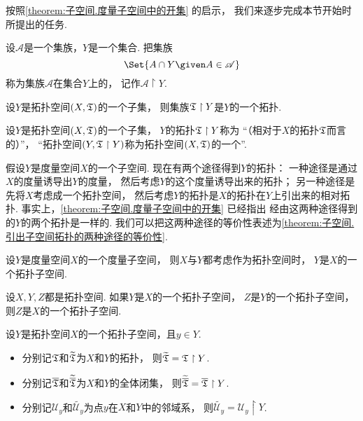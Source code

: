 按照\cref{theorem:子空间.度量子空间中的开集} 的启示，
我们来逐步完成本节开始时所提出的任务.

\begin{definition}\label{definition:子空间.拓扑子空间中的集族的限制}
设\(\mathscr{A}\)是一个集族，\(Y\)是一个集合.
把集族\[
	\Set{ A \cap Y \given A \in \mathscr{A} }
\]称为集族\(\mathscr{A}\)在集合\(Y\)上的，
记作\(\mathscr{A} \upharpoonright Y\).
\end{definition}

\begin{lemma}
设\(Y\)是拓扑空间\((X,{\mathfrak T})\)的一个子集，
则集族\({\mathfrak T} \upharpoonright Y\)是\(Y\)的一个拓扑.
\end{lemma}

\begin{definition}
设\(Y\)是拓扑空间\((X,{\mathfrak T})\)的一个子集，
\(Y\)的拓扑\({\mathfrak T} \upharpoonright Y\)称为
“（相对于\(X\)的拓扑\({\mathfrak T}\)而言的）”，
“拓扑空间\((Y,{\mathfrak T} \upharpoonright Y)\)称为拓扑空间\((X,{\mathfrak T})\)的一个”.
\end{definition}

假设\(Y\)是度量空间\(X\)的一个子空间.
现在有两个途径得到\(Y\)的拓扑：
一种途径是通过\(X\)的度量诱导出\(Y\)的度量，
然后考虑\(Y\)的这个度量诱导出来的拓扑；
另一种途径是先将\(X\)考虑成一个拓扑空间，
然后考虑\(Y\)的拓扑是\(X\)的拓扑在\(Y\)上引出来的相对拓扑.
事实上，\cref{theorem:子空间.度量子空间中的开集} 已经指出
经由这两种途径得到的\(Y\)的两个拓扑是一样的.
我们可以把这两种途径的等价性表述为\cref{theorem:子空间.引出子空间拓扑的两种途径的等价性}.
\begin{theorem}\label{theorem:子空间.引出子空间拓扑的两种途径的等价性}
设\(Y\)是度量空间\(X\)的一个度量子空间，
则\(X\)与\(Y\)都考虑作为拓扑空间时，
\(Y\)是\(X\)的一个拓扑子空间.
\end{theorem}

\begin{theorem}\label{theorem:子空间.亲子空间的传递性}
设\(X,Y,Z\)都是拓扑空间.
如果\(Y\)是\(X\)的一个拓扑子空间，
\(Z\)是\(Y\)的一个拓扑子空间，
则\(Z\)是\(X\)的一个拓扑子空间.
\end{theorem}

\begin{theorem}
设\(Y\)是拓扑空间\(X\)的一个拓扑子空间，且\(y \in Y\).
\def\Uy{\mathscr{U}_y}
\def\wUy{\widetilde{\Uy}}
\begin{itemize}
	\item 分别记\({\mathfrak T}\)和\(\widetilde{{\mathfrak T}}\)为\(X\)和\(Y\)的拓扑，
	则\(\widetilde{{\mathfrak T}} = {\mathfrak T} \upharpoonright Y\).
	\item 分别记\(\overline{{\mathfrak T}}\)和\(\widetilde{\overline{{\mathfrak T}}}\)为\(X\)和\(Y\)的全体闭集，
	则\(\widetilde{\overline{{\mathfrak T}}} = \overline{{\mathfrak T}} \upharpoonright Y\).
	\item 分别记\(\Uy\)和\(\wUy\)为点\(y\)在\(X\)和\(Y\)中的邻域系，
	则\(\wUy = \Uy \upharpoonright Y\).
\end{itemize}
\end{theorem}
